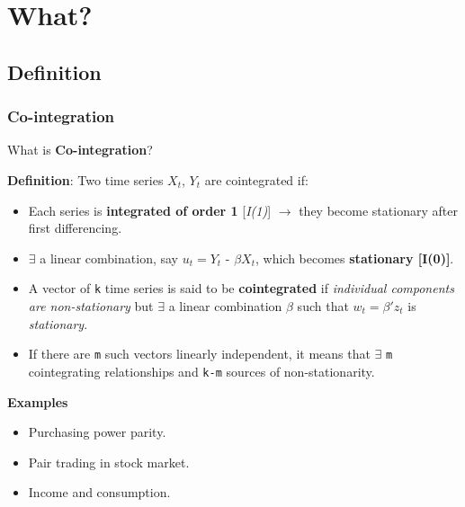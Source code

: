 \section{What?}

\subsection{Definition}
\begin{frame}[allowframebreaks]
	\frametitle{Co-integration}
	\centering
	What is \textbf{Co-integration}?
	\framebreak
	
	\textbf{Definition}: Two time series $X_t$, $Y_t$ are cointegrated if:
	\begin{itemize}
		\item Each series is \textbf{integrated of order 1} [\textit{I(1)}] $\rightarrow$ they become stationary after first differencing.
		\item $\exists$ a linear combination, say $u_t = Y_t$ - $\beta X_t$, which becomes \textbf{stationary [I(0)]}.
	\end{itemize}
	\framebreak
	
	\begin{itemize}
		\item A vector of \texttt{k} time series is said to be \textbf{cointegrated} if \textit{individual components are non-stationary} but $\exists$ a linear combination $\beta$ such that $w_t = \beta'z_t$ is \textit{stationary}.
		
		\item If there are \texttt{m} such vectors linearly independent, it means that $\exists$ \texttt{m} cointegrating relationships and \texttt{k-m} sources of non-stationarity.
	\end{itemize}
	\framebreak
	
	\textbf{Examples}
	\begin{itemize}
		\item Purchasing power parity.
		\item Pair trading in stock market.
		\item Income and consumption.
	\end{itemize}
\end{frame}

